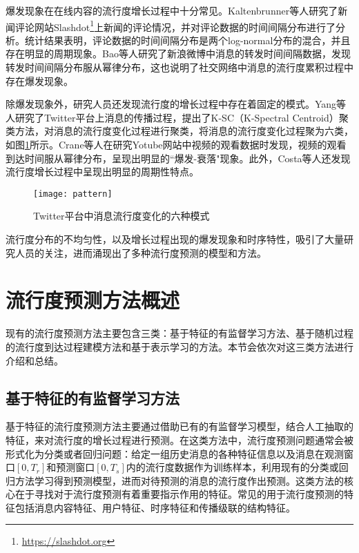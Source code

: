 爆发现象在在线内容的流行度增长过程中十分常见。Kaltenbrunner等人\citep{kaltenbrunner2007description}研究了新闻评论网站Slashdot\footnote{\url{https://slashdot.org}}上新闻的评论情况，并对评论数据的时间间隔分布进行了分析。统计结果表明，评论数据的时间间隔分布是两个log-normal分布的混合，并且存在明显的周期现象。Bao等人\citep{bao2013cumulative}研究了新浪微博中消息的转发时间间隔数据，发现转发时间间隔分布服从幂律分布，这也说明了社交网络中消息的流行度累积过程中存在爆发现象。

除爆发现象外，研究人员还发现流行度的增长过程中存在着固定的模式。Yang等人\citep{yang2011patterns}研究了Twitter平台上消息的传播过程，提出了K-SC（K-Spectral Centroid）聚类方法，对消息的流行度变化过程进行聚类，将消息的流行度变化过程聚为六类，如图\ref{fig:pattern}所示。Crane等人\citep{crane2008robust}在研究Yotube网站中视频的观看数据时发现，视频的观看到达时间服从幂律分布，呈现出明显的``爆发-衰落"现象。此外，Costa等人\citep{ferraz2015rsc}还发现流行度增长过程中呈现出明显的周期性特点。
\begin{figure}[!htbp]
  \centering
  \texttt{[image: pattern]}
  \caption{Twitter平台中消息流行度变化的六种模式\citep{yang2011patterns}}
  \label{fig:pattern}
\end{figure}

流行度分布的不均匀性，以及增长过程出现的爆发现象和时序特性，吸引了大量研究人员的关注，进而涌现出了多种流行度预测的模型和方法。
\section{流行度预测方法概述}
现有的流行度预测方法主要包含三类：基于特征的有监督学习方法、基于随机过程的流行度到达过程建模方法和基于表示学习的方法。本节会依次对这三类方法进行介绍和总结。
\subsection{基于特征的有监督学习方法}
基于特征的流行度预测方法主要通过借助已有的有监督学习模型，结合人工抽取的特征，来对流行度的增长过程进行预测。在这类方法中，流行度预测问题通常会被形式化为分类或者回归问题：给定一组历史消息的各种特征信息以及消息在观测窗口$[0,T_r]$和预测窗口$[0,T_s]$内的流行度数据作为训练样本，利用现有的分类或回归方法学习得到预测模型，进而对待预测的消息的流行度作出预测。这类方法的核心在于寻找对于流行度预测有着重要指示作用的特征。常见的用于流行度预测的特征包括消息内容特征、用户特征、时序特征和传播级联的结构特征。

